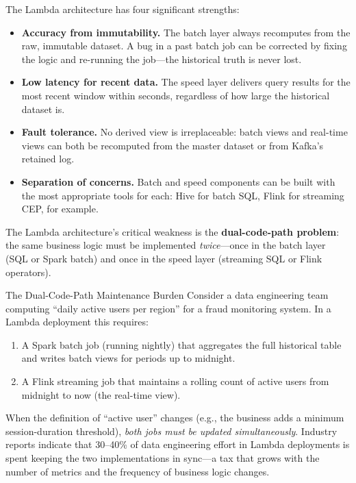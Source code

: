 The Lambda architecture has four significant strengths:
\begin{itemize}
  \item \textbf{Accuracy from immutability.} The batch layer always
        recomputes from the raw, immutable dataset. A bug in a past
        batch job can be corrected by fixing the logic and re-running
        the job---the historical truth is never lost.
  \item \textbf{Low latency for recent data.} The speed layer delivers
        query results for the most recent window within seconds,
        regardless of how large the historical dataset is.
  \item \textbf{Fault tolerance.} No derived view is irreplaceable:
        batch views and real-time views can both be recomputed from
        the master dataset or from Kafka's retained log.
  \item \textbf{Separation of concerns.} Batch and speed components
        can be built with the most appropriate tools for each: Hive
        for batch SQL, Flink for streaming CEP, for example.
\end{itemize}

The Lambda architecture's critical weakness is the \textbf{dual-code-path
problem}: the same business logic must be implemented \emph{twice}---once
in the batch layer (SQL or Spark batch) and once in the speed layer
(streaming SQL or Flink operators).

\begin{caution}{The Dual-Code-Path Maintenance Burden}
Consider a data engineering team computing ``daily active users per region''
for a fraud monitoring system. In a Lambda deployment this requires:
\begin{enumerate}
  \item A Spark batch job (running nightly) that aggregates the full
        historical table and writes batch views for periods up to midnight.
  \item A Flink streaming job that maintains a rolling count of active
        users from midnight to now (the real-time view).
\end{enumerate}
When the definition of ``active user'' changes (e.g., the business adds
a minimum session-duration threshold), \emph{both jobs must be updated
simultaneously}. Industry reports indicate that 30--40\% of data
engineering effort in Lambda deployments is spent keeping the two
implementations in sync---a tax that grows with the number of metrics
and the frequency of business logic changes.
\end{caution}

